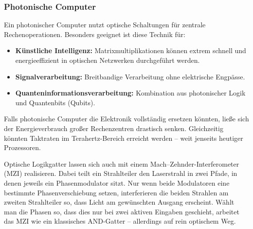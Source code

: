 \subsubsection{Photonische Computer}

Ein photonischer Computer nutzt optische Schaltungen für zentrale Rechenoperationen. Besonders geeignet ist diese Technik für:
\begin{itemize}
	\item \textbf{Künstliche Intelligenz:} Matrixmultiplikationen können extrem schnell und energieeffizient in optischen Netzwerken durchgeführt werden.
	\item \textbf{Signalverarbeitung:} Breitbandige Verarbeitung ohne elektrische Engpässe.
	\item \textbf{Quanteninformationsverarbeitung:} Kombination aus photonischer Logik und Quantenbits (Qubits).
\end{itemize}
\medskip
\begin{tcolorbox}[hypobox, title={Was wäre, wenn optische Computer Elektronik ablösen?}]
	\label{box:optlogik_zukunft}
	\small
	Falls photonische Computer die Elektronik vollständig ersetzen könnten, ließe sich der Energieverbrauch großer Rechenzentren drastisch senken. Gleichzeitig könnten Taktraten im Terahertz-Bereich erreicht werden – weit jenseits heutiger Prozessoren.
\end{tcolorbox}
Optische Logikgatter lassen sich auch mit einem Mach–Zehnder-Interferometer (MZI) realisieren. 
Dabei teilt ein Strahlteiler den Laserstrahl in zwei Pfade, in denen jeweils ein Phasenmodulator sitzt. 
Nur wenn beide Modulatoren eine bestimmte Phasenverschiebung setzen, interferieren die beiden Strahlen am zweiten Strahlteiler so, dass Licht am gewünschten Ausgang erscheint. 
Wählt man die Phasen so, dass dies nur bei zwei aktiven Eingaben geschieht, arbeitet das MZI wie ein klassisches \textsc{AND}-Gatter – allerdings auf rein optischem Weg. 
\medskip
